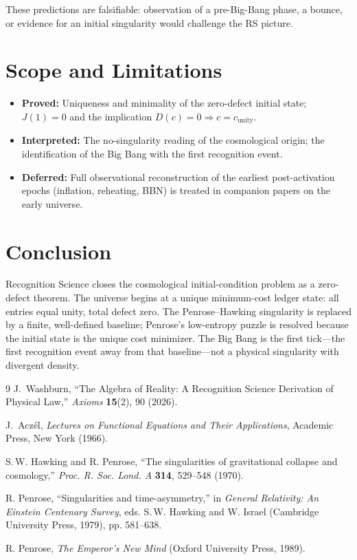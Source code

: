 \documentclass[12pt,a4paper]{article}
\theoremstyle{definition}
\theoremstyle{remark}
\begin{document}
These predictions are falsifiable: observation of a pre-Big-Bang phase,
a bounce, or evidence for an initial singularity would challenge the RS
picture.

\section{Scope and Limitations}

\begin{itemize}
\item \textbf{Proved:} Uniqueness and minimality of the zero-defect initial
state; $J(1) = 0$ and the implication $D(c) = 0 \Rightarrow c = c_{\mathrm{unity}}$.
\item \textbf{Interpreted:} The no-singularity reading of the cosmological
origin; the identification of the Big Bang with the first recognition event.
\item \textbf{Deferred:} Full observational reconstruction of the earliest
post-activation epochs (inflation, reheating, BBN) is treated in companion
papers on the early universe.
\end{itemize}

\section{Conclusion}

Recognition Science closes the cosmological initial-condition problem as a
zero-defect theorem.
The universe begins at a unique minimum-cost ledger state: all entries equal
unity, total defect zero.
The Penrose--Hawking singularity is replaced by a finite, well-defined
baseline; Penrose's low-entropy puzzle is resolved because the initial state
is the unique cost minimizer.
The Big Bang is the first tick---the first recognition event away from that
baseline---not a physical singularity with divergent density.

\begin{thebibliography}{9}
J.~Washburn, ``The Algebra of Reality: A Recognition Science Derivation
of Physical Law,'' \emph{Axioms} \textbf{15}(2), 90 (2026).

J.~Acz\'el, \textit{Lectures on Functional Equations and Their Applications},
Academic Press, New York (1966).

S.\,W. Hawking and R. Penrose,
``The singularities of gravitational collapse and cosmology,''
\textit{Proc. R. Soc. Lond. A} \textbf{314}, 529--548 (1970).

R. Penrose,
``Singularities and time-asymmetry,''
in \textit{General Relativity: An Einstein Centenary Survey},
eds. S.\,W. Hawking and W. Israel (Cambridge University Press, 1979), pp. 581--638.

R. Penrose,
\textit{The Emperor's New Mind} (Oxford University Press, 1989).
\end{thebibliography}
\end{document}
